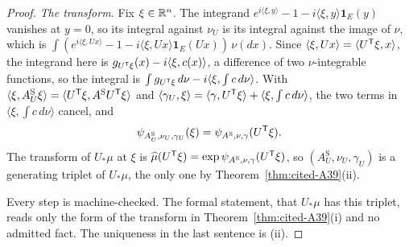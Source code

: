 \begin{proof}
\emph{The transform.} Fix $\xi \in \mathbb{R}^n$. The integrand $e^{i\langle \xi,y\rangle} - 1 - i\langle \xi,y\rangle\mathbf{1}_E(y)$
vanishes at $y = 0$, so its integral against $\nu_U$ is its integral against the image of $\nu$,
which is $\int (e^{i\langle \xi,Ux\rangle} - 1 - i\langle \xi,Ux\rangle\mathbf{1}_E(Ux))\,\nu(dx)$. Since
$\langle \xi, Ux\rangle = \langle U^{\mathsf{T}}\xi, x\rangle$, the integrand here is
$g_{U^{\mathsf{T}}\xi}(x) - i\langle \xi, c(x)\rangle$, a difference of two $\nu$-integrable functions, so the
integral is $\int g_{U^{\mathsf{T}}\xi}\,d\nu - i\langle \xi, \int c\,d\nu\rangle$. With
$\langle \xi, A^{\mathrm S}_U \xi\rangle = \langle U^{\mathsf{T}}\xi, A^{\mathrm S}U^{\mathsf{T}}\xi\rangle$ and
$\langle \gamma_U, \xi\rangle = \langle \gamma, U^{\mathsf{T}}\xi\rangle + \langle \xi, \int c\,d\nu\rangle$, the
two terms in $\langle \xi, \int c\,d\nu\rangle$ cancel, and
\[
  \psi_{A^{\mathrm S}_U,\nu_U,\gamma_U}(\xi) = \psi_{A^{\mathrm S},\nu,\gamma}(U^{\mathsf{T}}\xi).
\]
The transform of $U_*\mu$ at $\xi$ is $\widehat\mu(U^{\mathsf{T}}\xi) = \exp\psi_{A^{\mathrm S},\nu,\gamma}(U^{\mathsf{T}}\xi)$,
so $(A^{\mathrm S}_U, \nu_U, \gamma_U)$ is a generating triplet of $U_*\mu$, the only one by
Theorem~\ref{thm:cited-A39}(ii).

Every step is machine-checked. The formal statement, that $U_*\mu$ has this triplet, reads only
the form of the transform in Theorem~\ref{thm:cited-A39}(i) and no admitted fact. The
uniqueness in the last sentence is (ii).
\end{proof}

